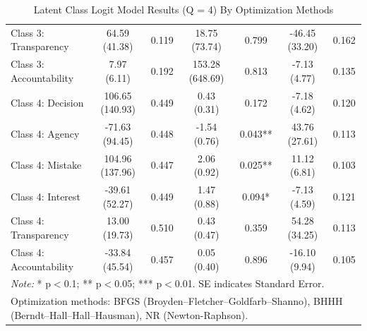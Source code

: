 \begin{table}
{\begin{tabular}{lcccccc}
Class 3: Transparency & 64.59 (41.38) & 0.119 & 18.75 (73.74) & 0.799 & -46.45 (33.20) & 0.162 \\
Class 3: Accountability & 7.97 (6.11) & 0.192 & 153.28 (648.69) & 0.813 & -7.13 (4.77) & 0.135 \\
Class 4: Decision & 106.65 (140.93) & 0.449 & 0.43 (0.31) & 0.172 & -7.18 (4.62) & 0.120 \\
Class 4: Agency & -71.63 (94.45) & 0.448 & -1.54 (0.76) & 0.043** & 43.76 (27.61) & 0.113 \\
Class 4: Mistake & 104.96 (137.96) & 0.447 & 2.06 (0.92) & 0.025** & 11.12 (6.81) & 0.103 \\
Class 4: Interest & -39.61 (52.27) & 0.449 & 1.47 (0.88) & 0.094* & -7.13 (4.59) & 0.121 \\
Class 4: Transparency & 13.00 (19.73) & 0.510 & 0.43 (0.47) & 0.359 & 54.28 (34.25) & 0.113 \\
Class 4: Accountability & -33.84 (45.54) & 0.457 & 0.05 (0.40) & 0.896 & -16.10 (9.94) & 0.105 \\
\hline
\multicolumn{7}{l}{\footnotesize \textit{Note:} * p$<$0.1; ** p$<$0.05; *** p$<$0.01. SE indicates Standard Error.} \\
\multicolumn{7}{l}{\footnotesize Optimization methods: BFGS (Broyden–Fletcher–Goldfarb–Shanno), BHHH (Berndt–Hall–Hall–Hausman), NR (Newton-Raphson).}
\end{tabular}%
}
\caption{Latent Class Logit Model Results (Q = 4) By Optimization Methods}
\label{tab:combined_lc_logit_n4}
\end{table}


